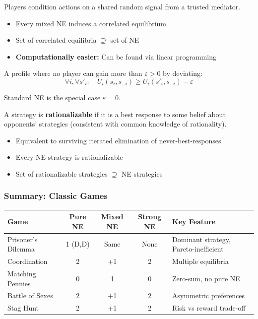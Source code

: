 \begin{defbox}
Players condition actions on a shared random signal from a trusted mediator.

\begin{itemize}
  \item Every mixed NE induces a correlated equilibrium
  \item Set of correlated equilibria $\supseteq$ set of NE
  \item \textbf{Computationally easier:} Can be found via linear programming
\end{itemize}
\end{defbox}

\begin{defbox}
A profile where no player can gain more than $\varepsilon > 0$ by deviating:
\[
\forall i, \forall s'_i: \quad U_i(s_i, s_{-i}) \geq U_i(s'_i, s_{-i}) - \varepsilon
\]

Standard NE is the special case $\varepsilon = 0$.
\end{defbox}

\begin{defbox}
A strategy is \textbf{rationalizable} if it is a best response to some belief about opponents' strategies (consistent with common knowledge of rationality).

\begin{itemize}
  \item Equivalent to surviving iterated elimination of never-best-responses
  \item Every NE strategy is rationalizable
  \item Set of rationalizable strategies $\supseteq$ NE strategies
\end{itemize}
\end{defbox}

\bigseparator

\subsubsection{Summary: Classic Games}

\begin{center}
\renewcommand{\arraystretch}{1.4}
\begin{tabular}{@{} l c c c p{4cm} @{}}
\toprule
\textbf{Game} & \textbf{Pure NE} & \textbf{Mixed NE} & \textbf{Strong NE} & \textbf{Key Feature} \\
\midrule
Prisoner's Dilemma & 1 (D,D) & Same & None & Dominant strategy, Pareto-inefficient \\
Coordination & 2 & +1 & 2 & Multiple equilibria \\
Matching Pennies & 0 & 1 & 0 & Zero-sum, no pure NE \\
Battle of Sexes & 2 & +1 & 2 & Asymmetric preferences \\
Stag Hunt & 2 & +1 & 2 & Risk vs reward trade-off \\
\bottomrule
\end{tabular}
\end{center}

